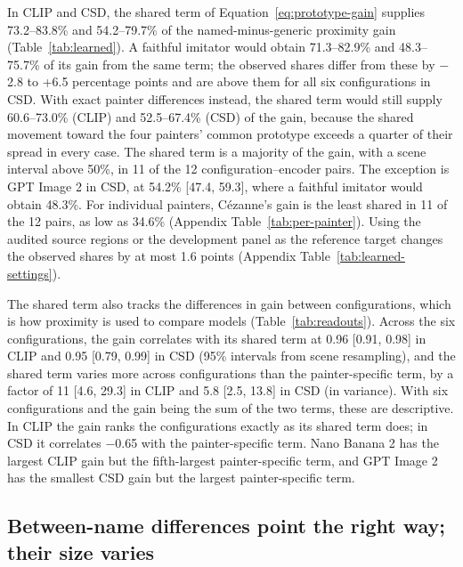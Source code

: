 \documentclass[10pt]{article}
\begin{document}



In CLIP and CSD, the shared term of Equation~\ref{eq:prototype-gain} supplies 73.2--83.8\% and
54.2--79.7\% of the named-minus-generic proximity gain (Table~\ref{tab:learned}). A faithful
imitator would obtain 71.3--82.9\% and 48.3--75.7\% of its gain from the same term; the observed
shares differ from these by $-$2.8 to +6.5 percentage points and are above them for all six
configurations in CSD. With exact painter differences instead, the shared term would still supply
60.6--73.0\% (CLIP) and 52.5--67.4\% (CSD) of the gain, because the shared movement toward the four
painters' common prototype exceeds a quarter of their spread in every case. The shared term is a
majority of the gain, with a scene interval above 50\%, in 11 of the 12 configuration--encoder pairs.
The exception is GPT Image 2 in CSD, at 54.2\% [47.4, 59.3], where a faithful imitator would obtain
48.3\%. For individual painters, C\'ezanne's gain is the least shared in 11 of the 12 pairs, as low
as 34.6\% (Appendix Table~\ref{tab:per-painter}). Using the audited source regions or the
development panel as the reference target changes the observed shares by at most 1.6 points
(Appendix Table~\ref{tab:learned-settings}).

The shared term also tracks the differences in gain between configurations, which is how proximity
is used to compare models (Table~\ref{tab:readouts}). Across the six configurations, the gain
correlates with its shared term at 0.96 [0.91, 0.98] in CLIP and 0.95 [0.79, 0.99] in CSD (95\%
intervals from scene resampling), and the shared term varies more across configurations than the
painter-specific term, by a factor of 11 [4.6, 29.3] in CLIP and 5.8 [2.5, 13.8] in CSD (in
variance). With six configurations and the gain being the sum of the two terms, these are
descriptive. In CLIP the gain ranks the configurations exactly as its shared term does; in CSD it
correlates $-$0.65 with the painter-specific term. Nano Banana 2 has the largest CLIP gain but the
fifth-largest painter-specific term, and GPT Image 2 has the smallest CSD gain but the largest
painter-specific term.

\subsection{Between-name differences point the right way; their size varies}\label{sec:agreement}


\end{document}
